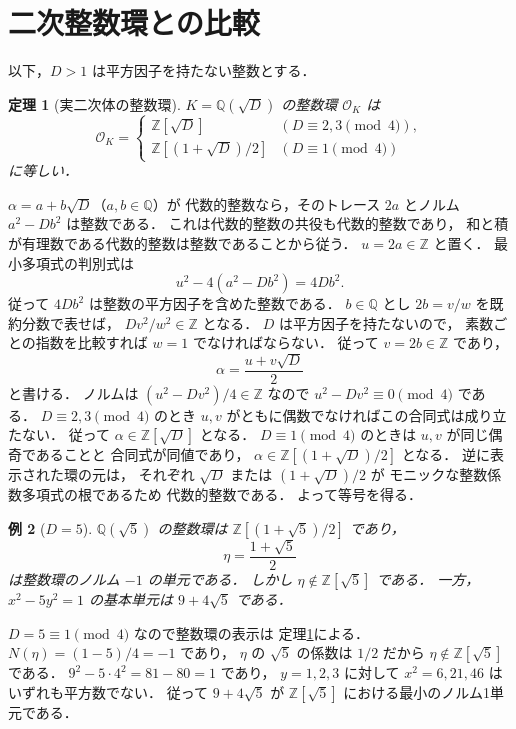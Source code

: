 \documentclass[a5paper,10pt,onecolumn]{jsarticle}
\makeatletter
\theoremstyle{mathnotetheorem}
\newtheorem{theorem}{定理}[section]
\newtheorem{example}[theorem]{例}
\renewcommand{\proofname}{証明}
\renewenvironment{proof}[1][\proofname]{%
  \par\pushQED{\qed}\normalfont\topsep4\p@\@plus2\p@\relax
  \trivlist\item[\hskip\labelsep\bfseries #1]\ignorespaces
}{\popQED\endtrivlist\@endpefalse}
\makeatother
\begin{document}
\section{二次整数環との比較}

以下，$D>1$ は平方因子を持たない整数とする．

\begin{theorem}[実二次体の整数環]\label{thm:integers}
$K=\mathbb Q(\sqrt D)$ の整数環 $\mathcal O_K$ は
\[
 \mathcal O_K=
 \begin{cases}
 \mathbb Z[\sqrt D]&(D\equiv2,3\pmod4),\\[2mm]
 \mathbb Z[(1+\sqrt D)/2]&(D\equiv1\pmod4)
 \end{cases}
\]
に等しい．
\end{theorem}
\begin{proof}
$\alpha=a+b\sqrt D$（$a,b\in\mathbb Q$）が
代数的整数なら，そのトレース $2a$ とノルム
$a^2-Db^2$ は整数である．
これは代数的整数の共役も代数的整数であり，
和と積が有理数である代数的整数は整数であることから従う．
$u=2a\in\mathbb Z$ と置く．
最小多項式の判別式は
\[
 u^2-4(a^2-Db^2)=4Db^2.
\]
従って $4Db^2$ は整数の平方因子を含めた整数である．
$b\in\mathbb Q$ とし $2b=v/w$ を既約分数で表せば，
$D v^2/w^2\in\mathbb Z$ となる．
$D$ は平方因子を持たないので，
素数ごとの指数を比較すれば $w=1$ でなければならない．
従って $v=2b\in\mathbb Z$ であり，
\[
 \alpha=\frac{u+v\sqrt D}{2}
\]
と書ける．
ノルムは
$(u^2-Dv^2)/4\in\mathbb Z$ なので
$u^2-Dv^2\equiv0\pmod4$ である．
$D\equiv2,3\pmod4$ のとき
$u,v$ がともに偶数でなければこの合同式は成り立たない．
従って $\alpha\in\mathbb Z[\sqrt D]$ となる．
$D\equiv1\pmod4$ のときは $u,v$ が同じ偶奇であることと
合同式が同値であり，
$\alpha\in\mathbb Z[(1+\sqrt D)/2]$ となる．
逆に表示された環の元は，
それぞれ $\sqrt D$ または $(1+\sqrt D)/2$ が
モニックな整数係数多項式の根であるため
代数的整数である．
よって等号を得る．
\end{proof}

\begin{example}[$D=5$]
$\mathbb Q(\sqrt5)$ の整数環は
$\mathbb Z[(1+\sqrt5)/2]$ であり，
\[
 \eta=\frac{1+\sqrt5}{2}
\]
は整数環のノルム $-1$ の単元である．
しかし $\eta\notin\mathbb Z[\sqrt5]$ である．
一方，$x^2-5y^2=1$ の基本単元は
$9+4\sqrt5$ である．
\end{example}
\begin{proof}
$D=5\equiv1\pmod4$ なので整数環の表示は
定理\ref{thm:integers}による．
$N(\eta)=(1-5)/4=-1$ であり，
$\eta$ の $\sqrt5$ の係数は $1/2$ だから
$\eta\notin\mathbb Z[\sqrt5]$ である．
$9^2-5\cdot4^2=81-80=1$ であり，
$y=1,2,3$ に対して
$x^2=6,21,46$ はいずれも平方数でない．
従って $9+4\sqrt5$ が
$\mathbb Z[\sqrt5]$ における最小のノルム1単元である．
\end{proof}
\end{document}
